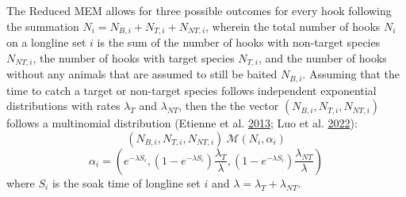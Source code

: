 \documentclass[12pt]{article}\usepackage[]{graphicx}\usepackage[]{color}
\begin{document}
The Reduced MEM allows for three possible outcomes for every hook following the summation \(N_i = N_{B,i}+N_{T,i}+N_{NT,i}\), wherein the total number of hooks \(N_i\) on a longline set \(i\) is the sum of the number of hooks with non-target species \(N_{NT,i}\), the number of hooks with target species \(N_{T,i}\), and the number of hooks without any animals that are assumed to still be baited \(N_{B,i}\). Assuming that the time to catch a target or non-target species follows independent exponential distributions with rates \(\lambda_T\) and \(\lambda_{NT}\), then the the vector \((N_{B,i},N_{T,i},N_{NT,i})\) follows a multinomial distribution (Etienne et al. \protect\hyperlink{ref-Etienne2013}{2013}; Luo et al. \protect\hyperlink{ref-Luo2022}{2022}):
\begin{equation}
(N_{B,i},N_{T,i},N_{NT,i}) ~ \mathcal{M}(N_i,\alpha_i)
\end{equation} \begin{equation}
\alpha_i = (e^{-\lambda S_i},(1-e^{-\lambda S_i})\frac{\lambda_T}{\lambda},(1-e^{-\lambda S_i})\frac{\lambda_{NT}}{\lambda})
\end{equation}
where \(S_i\) is the soak time of longline set \(i\) and \(\lambda = \lambda_T + \lambda_{NT}\).
\end{document}

